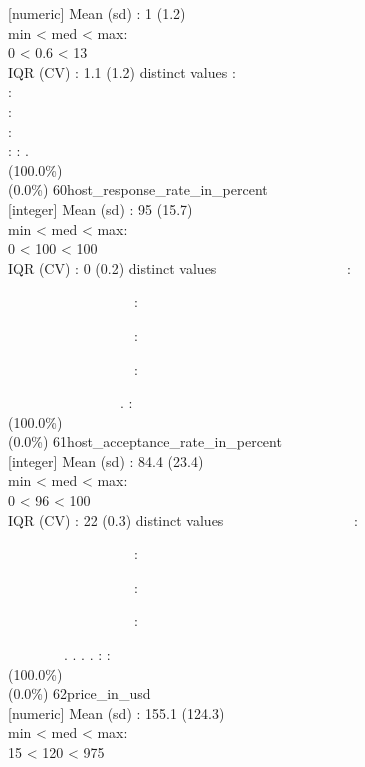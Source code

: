 \documentclass[
  journal,
]{IEEEtran}%
\begin{document}
{[}numeric{]} \textbar Mean (sd) : 1 (1.2)\\
min \textless{} med \textless{} max:\\
0 \textless{} 0.6 \textless{} 13\\
IQR (CV) : 1.1 (1.2)  distinct values \textbar{} \textbar:\\
:\\
:\\
:\\
: : . \\
(100.0\%) \\
(0.0\%) \textbar{} \textbar{}
60\textbar host\_response\_rate\_in\_percent\\
{[}integer{]} \textbar Mean (sd) : 95 (15.7)\\
min \textless{} med \textless{} max:\\
0 \textless{} 100 \textless{} 100\\
IQR (CV) : 0 (0.2)  distinct values \textbar{}
\textbar~~~~~~~~~~~~~~~~~~:\\
\strut ~~~~~~~~~~~~~~~~~~:\\
\strut ~~~~~~~~~~~~~~~~~~:\\
\strut ~~~~~~~~~~~~~~~~~~:\\
\strut ~~~~~~~~~~~~~~~~. : \\
(100.0\%) \\
(0.0\%) \textbar{} \textbar{}
61\textbar host\_acceptance\_rate\_in\_percent\\
{[}integer{]} \textbar Mean (sd) : 84.4 (23.4)\\
min \textless{} med \textless{} max:\\
0 \textless{} 96 \textless{} 100\\
IQR (CV) : 22 (0.3)  distinct values \textbar{}
\textbar~~~~~~~~~~~~~~~~~~:\\
\strut ~~~~~~~~~~~~~~~~~~:\\
\strut ~~~~~~~~~~~~~~~~~~:\\
\strut ~~~~~~~~~~~~~~~~~~:\\
\strut ~~~~~~~~. . . . : : \\
(100.0\%) \\
(0.0\%) \textbar{} \textbar{} 62\textbar price\_in\_usd\\
{[}numeric{]} \textbar Mean (sd) : 155.1 (124.3)\\
min \textless{} med \textless{} max:\\
15 \textless{} 120 \textless{} 975\\
\end{document}
